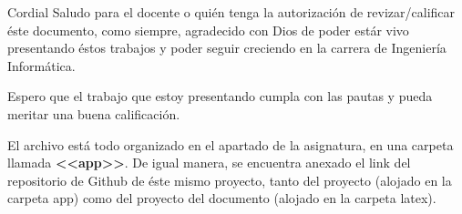 Cordial Saludo para el docente o quién tenga la autorización de revizar/calificar éste documento, como siempre, agradecido con Dios de poder estár vivo presentando éstos trabajos y poder seguir creciendo en la carrera de Ingeniería Informática.

Espero que el trabajo que estoy presentando cumpla con las pautas y pueda meritar una buena calificación.

El archivo está todo organizado en el apartado de la asignatura, en una carpeta llamada \textbf{<<app>>}. De igual manera, se encuentra anexado el link del repositorio de Github de éste mismo proyecto, tanto del proyecto (alojado en la carpeta app) como del proyecto del documento (alojado en la carpeta latex).






